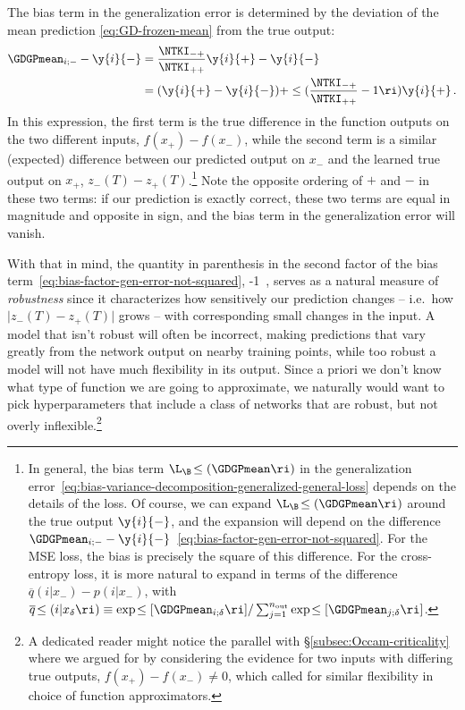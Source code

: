 The bias term in the generalization error is determined by the deviation of the mean prediction \eqref{eq:GD-frozen-mean} from the true output:
\begin{align}\label{eq:bias-factor-gen-error-not-squared}
\GDGPmean_{i;-}-\y{i}{-}&=\frac{\NTKI_{-+}}{\NTKI_{++}}\y{i}{+}-\y{i}{-} \, \notag \\
&=(\y{i}{+}-\y{i}{-}) + \le(\frac{\NTKI_{-+}}{\NTKI_{++}}-1\ri)\y{i}{+}\, .
\end{align}
In this expression, the first term is the true difference in the function outputs on the two different inputs, $f(x_{+})-f(x_-)$, while the second term is a similar (expected) difference between our predicted output on $x_-$ and the learned true output on $x_+$, $z_-(T) - z_+(T)$.\footnote{
    In general, the bias term $\L_{\B}\!\le(\GDGPmean\ri)$ in the generalization error~\eqref{eq:bias-variance-decomposition-generalized-general-loss} depends on the details of the loss. Of course, we can expand $\L_{\B}\!\le(\GDGPmean\ri)$ around the true output $\y{i}{-}$, and the expansion will depend on the difference $\GDGPmean_{i;-}-\y{i}{-}$~\eqref{eq:bias-factor-gen-error-not-squared}. For the MSE loss, the bias is precisely the square of this difference. For the cross-entropy loss, it is more natural to expand in terms of the difference $\overline{q}(i\vert x_{-})-p(i\vert x_{-})$, with $\overline{q}\!\le(i|x_\delta\ri)\equiv \exp\!\le[\GDGPmean_{i;\delta}\ri]/\sum_{j=1}^{n_\text{out}}\exp\!\le[\GDGPmean_{j;\delta}\ri]$.
} Note the opposite ordering of $+$ and $-$ in these two terms: if our prediction is exactly correct, these two terms are equal in magnitude and opposite in sign, and the bias term in the generalization error will vanish.

With that in mind, the quantity in parenthesis in the second factor of the bias term~\eqref{eq:bias-factor-gen-error-not-squared},
\be\label{eq:robustness-measure}
\frac{\NTKI_{-+}}{\NTKI_{++}}-1\, ,
\ee 
serves as a natural measure of \emph{robustness} since it characterizes how sensitively our prediction changes -- i.e.~how $\vert z_-(T) - z_+(T)\vert$ grows -- with corresponding small changes in the input. A model that isn't robust will often be incorrect, making predictions that vary greatly from the network output on nearby training points,
while too robust a model will not have much flexibility in its output. Since a priori we don't know what type of function we are going to approximate, we naturally would want to pick hyperparameters that include a class of networks that are robust, but not overly inflexible.\footnote{A dedicated reader might notice the parallel with \S\ref{subsec:Occam-criticality} where we argued for  by considering the evidence for two inputs with differing true outputs, $f(x_{+})-f(x_-)\ne 0$, which called for similar flexibility in choice of function approximators.}



